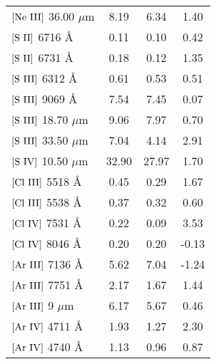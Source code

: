 \documentclass[a4paper,fleqn,usenatbib]{mnras}
\begin{document}
\begin{table}
\begin{tabular}{lccc}
$\mathrm{	[Ne~{\sc	III}]	}$	36.00	$\mu$m	&	8.19	&	6.34	&	1.40	\\
$\mathrm{	[S~{\sc	II}]	}$	6716	{\AA}	&	0.11	&	0.10	&	0.42	\\
$\mathrm{	[S~{\sc	II}]	}$	6731	{\AA}	&	0.18	&	0.12	&	1.35	\\
$\mathrm{	[S~{\sc	III}]	}$	6312	{\AA}	&	0.61	&	0.53	&	0.51	\\
$\mathrm{	[S~{\sc	III}]	}$	9069	{\AA}	&	7.54	&	7.45	&	0.07	\\
$\mathrm{	[S~{\sc	III}]	}$	18.70	$\mu$m	&	9.06	&	7.97	&	0.70	\\
$\mathrm{	[S~{\sc	III}]	}$	33.50	$\mu$m	&	7.04	&	4.14	&	2.91	\\
$\mathrm{	[S~{\sc	IV}]	}$	10.50	$\mu$m	&	32.90	&	27.97	&	1.70	\\
$\mathrm{	[Cl~{\sc	III}]	}$	5518	{\AA}	&	0.45	&	0.29	&	1.67	\\
$\mathrm{	[Cl~{\sc	III}]	}$	5538	{\AA}	&	0.37	&	0.32	&	0.60	\\
$\mathrm{	[Cl~{\sc	IV}]	}$	7531	{\AA}	&	0.22	&	0.09	&	3.53	\\
$\mathrm{	[Cl~{\sc	IV}]	}$	8046	{\AA}	&	0.20	&	0.20	&	-0.13	\\
$\mathrm{	[Ar~{\sc	III}]	}$	7136	{\AA}	&	5.62	&	7.04	&	-1.24	\\
$\mathrm{	[Ar~{\sc	III}]	}$	7751	{\AA}	&	2.17	&	1.67	&	1.44	\\
$\mathrm{	[Ar~{\sc	III}]	}$	9	$\mu$m	&	6.17	&	5.67	&	0.46	\\
$\mathrm{	[Ar~{\sc	IV}]	}$	4711	{\AA}	&	1.93	&	1.27	&	2.30	\\
$\mathrm{	[Ar~{\sc	IV}]	}$	4740	{\AA}	&	1.13	&	0.96	&	0.87	\\
\hline
\end{tabular}
\end{table}     
\end{document}
